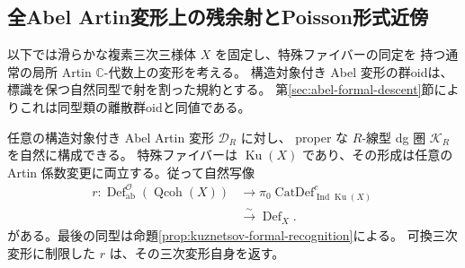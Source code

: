 \subsection{全Abel Artin変形上の残余射とPoisson形式近傍}
\label{subsec:poisson-formal-residual}

以下では滑らかな複素三次三様体 $X$ を固定し、特殊ファイバーの同定を
持つ通常の局所 Artin $\mathbb C$-代数上の変形を考える。
構造対象付き Abel 変形の群oidは、標識を保つ自然同型で射を割った規約とする。
第\ref{sec:abel-formal-descent}節によりこれは同型類の離散群oidと同値である。

\begin{proposition}[全Abel形式近傍上の実際の残余射]
\label{prop:abel-artin-actual-residual}
任意の構造対象付き Abel Artin 変形 $\mathcal D_R$ に対し、
proper な $R$-線型 dg 圏 $\mathcal K_R$ を自然に構成できる。
特殊ファイバーは $\operatorname{Ku}(X)$ であり、その形成は任意の Artin
係数変更に両立する。従って自然写像
\[
 \begin{aligned}
 r:\operatorname{Def}^{\mathcal O}_{\mathrm{ab}}(\operatorname{Qcoh}(X))
 &\longrightarrow
 \pi_0\operatorname{CatDef}^{c}_{\operatorname{Ind}\operatorname{Ku}(X)}\\
 &\xrightarrow{\ \sim\ }\operatorname{Def}_X.
 \end{aligned}
\]
がある。最後の同型は命題\ref{prop:kuznetsov-formal-recognition}による。
可換三次変形に制限した $r$ は、その三次変形自身を返す。
\end{proposition}

